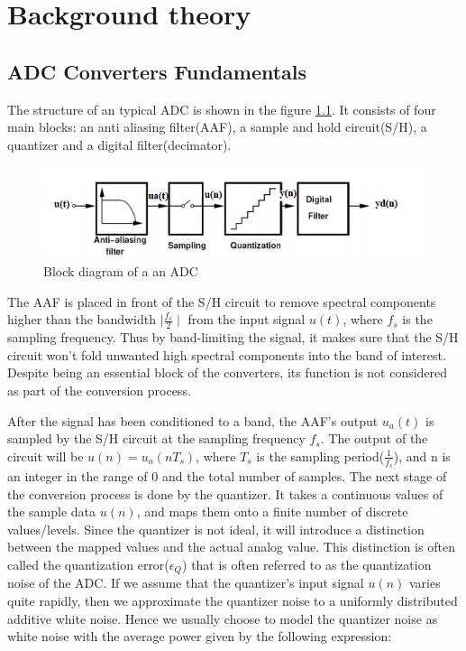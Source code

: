 \chapter{Background theory}\label{Background_theory}

\section{ADC Converters Fundamentals }\label{fundamentals}

The structure of an typical ADC is shown in the figure \ref{fig:adc_block}. It consists of four main blocks: an anti aliasing filter(AAF), a sample and hold circuit(S/H), a quantizer and a digital filter(decimator).
\begin{figure}[h]
\centering
\includegraphics[scale=0.9]{images/adc_block.png}
\caption{Block diagram of a an ADC}
\label{fig:adc_block}
\end{figure}

The AAF is placed in front of the S/H circuit to remove spectral components higher than the bandwidth $\mid\frac{f_s}{2}\mid$ from the input signal $u(t)$, where $f_s$ is the sampling frequency. Thus by band-limiting the signal, it makes sure that the S/H circuit won't fold unwanted high spectral components into the band of interest. Despite being an essential block of the converters, its function is not considered as part of the conversion process.

After the signal has been conditioned to a band, the AAF's output $u_a(t)$ is sampled by the S/H circuit at the sampling frequency $f_s$. The output of the circuit will be $u(n) = u_a(nT_s)$, where $T_s$ is the sampling period($\frac{1}{f_s}$), and n is an integer in the range of 0 and the total number of samples. The next stage of the conversion process is done by the quantizer. It takes a continuous values of the sample data $u(n)$, and maps them onto a finite number of discrete values/levels. Since the quantizer is not ideal, it will introduce a distinction between the mapped values and the actual analog value. This distinction is often called the quantization error($\epsilon_Q$) that is often referred to as the quantization noise of the ADC. If we assume that the quantizer's input signal $u(n)$ varies quite rapidly, then we approximate the quantizer noise to a uniformly distributed additive white noise. Hence we usually choose to model the quantizer noise as white noise with the average power given by the following expression: 

